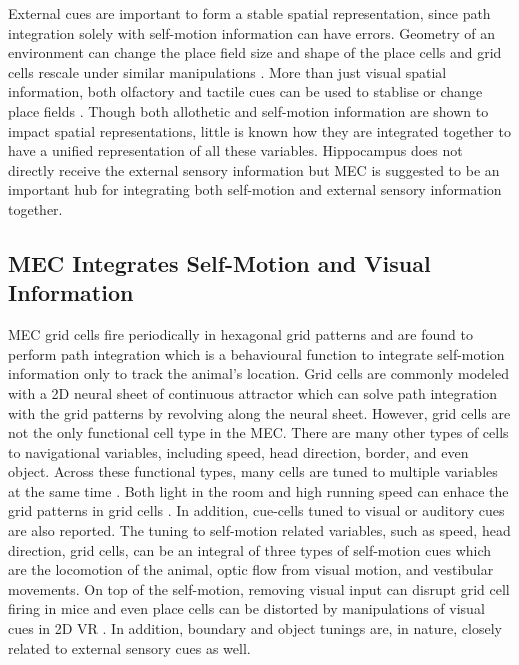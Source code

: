 External cues are important to form a stable spatial representation, since path integration solely with self-motion information can have errors. Geometry of an environment can change the place field size and shape of the place cells \cite{okeefe_geometric_1996} and grid cells rescale under similar manipulations \cite{barry_experience-dependent_2007}. More than just visual spatial information, both olfactory and tactile cues can be used to stablise or change place fields \cite{gener_tactile_2013, zhang_spatial_2015}. Though both allothetic and self-motion information are shown to impact spatial representations, little is known how they are integrated together to have a unified representation of all these variables. Hippocampus does not directly receive the external sensory information but MEC is suggested to be an important hub for integrating both self-motion and external sensory information together.

\subsection{MEC Integrates Self-Motion and Visual Information}
MEC grid cells fire periodically in hexagonal grid patterns and are found to perform path integration which is a behavioural function to integrate self-motion information only to track the animal's location. Grid cells are commonly modeled with a 2D neural sheet of continuous attractor which can solve path integration with the grid patterns by revolving along the neural sheet. However, grid cells are not the only functional cell type in the MEC. There are many other types of cells to navigational variables, including speed, head direction, border, and even object. Across these functional types, many cells are tuned to multiple variables at the same time \cite{hardcastle_multiplexed_2017, sargolini_conjunctive_2006}. Both light in the room and high running speed can enhace the grid patterns in grid cells \cite{chen_absence_2016, hardcastle_multiplexed_2017}. In addition, cue-cells tuned to visual or auditory cues are also reported. The tuning to self-motion related variables, such as speed, head direction, grid cells, can be an integral of three types of self-motion cues which are the locomotion of the animal, optic flow from visual motion, and vestibular movements. On top of the self-motion, removing visual input can disrupt grid cell firing in mice \cite{chen_absence_2016} and even place cells can be distorted by manipulations of visual cues in 2D VR \cite{chen_how_2013}. In addition, boundary and object tunings are, in nature, closely related to external sensory cues as well. 

